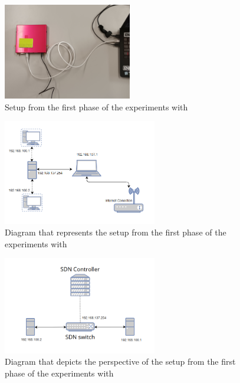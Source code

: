 \begin{figure}
	\centering
	\includegraphics[width=0.5\textwidth]{Chapters/Figures/tests/ovs_phase_1/20241122_155830.jpg}
	\caption{Setup from the first phase of the experiments with }
	\label{fig:exp1_phase1_setup}
\end{figure}

\begin{figure}
	\centering
	\includegraphics[width=0.6\textwidth]{Chapters/Figures/tests/ovs_phase_1/setup_diagram.PNG}
	\caption{Diagram that represents the setup from the first phase of the experiments with }
	\label{fig:exp1_phase1_diagram}
\end{figure}

\begin{figure}
	\centering
	\includegraphics[width=0.6\textwidth]{Chapters/Figures/tests/ovs_phase_1/sdn_diagram.PNG}
	\caption{Diagram that depicts the  perspective of the setup from the first phase of the experiments with }
	\label{fig:exp1_phase1_sdn_diagram}
\end{figure}


